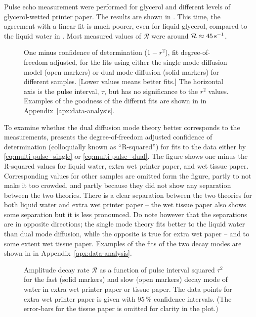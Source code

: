 \documentclass[11pt,a4paper, twocolumn,
swedish, english %
]{article}
\begin{document}
Pulse echo measurement were performed for glycerol and
different levels of glycerol-wetted printer paper. The results are
shown in . This time, the agreement with a linear fit
is much poorer, even for liquid glycerol, compared to the liquid water
in . Most measured values of $\mathcal{R}$ were
around $\mathcal{R}\approx\unit[45]{s^{-1}}$.


\begin{figure*}
\centering

\caption{One minus confidence of determination ($1-r^2$),
  fit degree-of-freedom adjusted, for the fits using either the single
  mode diffusion model (open markers) or dual mode diffusion (solid
  markers) for different samples. [Lower values means better fits.]
  The horizontal axis is the pulse interval, $\tau$, but has no
  significance to the $r^2$ values. Examples of the goodness of the
  differnt fits are shown in  in
  Appendix~\ref{apx:data-analysis}. 
} 
\label{fig:good-fit}
\end{figure*}

To examine whether the dual diffusion mode theory better corresponds
to the measurements,  presents the
degree-of-freedom adjusted confidence of determination (colloquially
known as ``R-squared'') for fits to the data either by
\eqref{eq:multi-pulse_single} or \eqref{eq:multi-pulse_dual}. The
figure shows one minus the R-squared values for liquid water, extra
wet printer paper, and wet tissue paper. Corresponding values for other
samples are omitted form the figure, partly to not make it too
crowded, and partly because they did not show any separation between
the two theories. There is a clear separation between the two theories for
both liquid water and extra wet printer paper -- the wet tissue paper
also shows some separation but it is less
pronounced. Do note however that the separations are in opposite
directions; the single mode theory fits better to the liquid water
than dual mode diffusion, while the opposite is true for extra wet
paper -- and to some extent wet tissue paper. Examples of the
fits of the two decay modes are shown in  in
Appendix~\ref{apx:data-analysis}. 


\begin{figure*}
\centering

\caption{Amplitude decay rate $\mathcal{R}$ as a function of pulse
  interval squared $\tau^2$ for the fast (solid markers) and slow
  (open markers) decay mode of water in extra wet printer paper or
  tissue paper. The data points for extra wet printer paper is given
  with 95\,\% confidence intervals. (The error-bars for the tissue
  paper is omitted for clarity in the plot.) } 
\label{fig:dual-diff}
\end{figure*}
\end{document}
